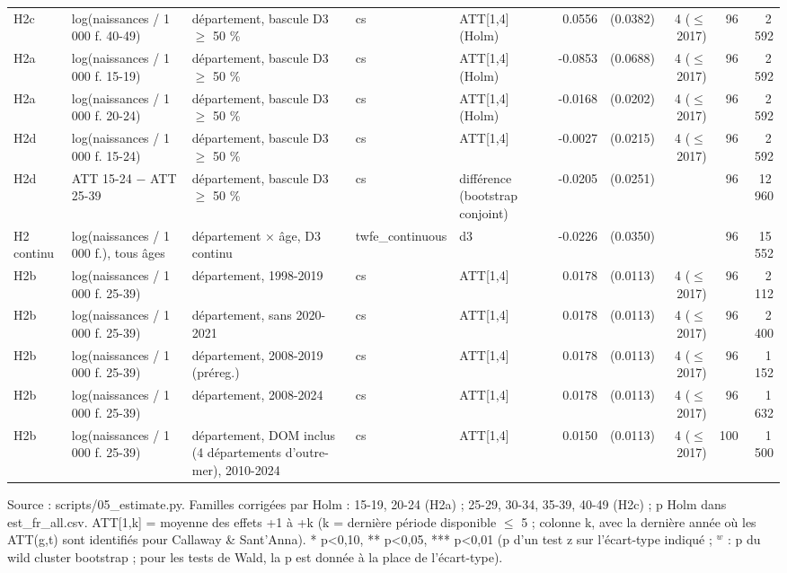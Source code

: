 \begin{table}
\begin{threeparttable}
\begin{tabular}{lp{4.0cm}p{5.1cm}lp{3.5cm}rrrrr}
H2c & log(naissances / 1 000 f. 40-49) & département, bascule D3 $\geq$ 50 \% & cs & ATT[1,4] (Holm) & 0.0556 & (0.0382) & 4 ($\leq$ 2017) & 96 & 2\,592 \\
H2a & log(naissances / 1 000 f. 15-19) & département, bascule D3 $\geq$ 50 \% & cs & ATT[1,4] (Holm) & -0.0853 & (0.0688) & 4 ($\leq$ 2017) & 96 & 2\,592 \\
H2a & log(naissances / 1 000 f. 20-24) & département, bascule D3 $\geq$ 50 \% & cs & ATT[1,4] (Holm) & -0.0168 & (0.0202) & 4 ($\leq$ 2017) & 96 & 2\,592 \\
H2d & log(naissances / 1 000 f. 15-24) & département, bascule D3 $\geq$ 50 \% & cs & ATT[1,4] & -0.0027 & (0.0215) & 4 ($\leq$ 2017) & 96 & 2\,592 \\
H2d & ATT 15-24 $-$ ATT 25-39 & département, bascule D3 $\geq$ 50 \% & cs & différence (bootstrap conjoint) & -0.0205 & (0.0251) &  & 96 & 12\,960 \\
H2 continu & log(naissances / 1 000 f.), tous âges & département × âge, D3 continu & twfe\_continuous & d3 & -0.0226 & (0.0350) &  & 96 & 15\,552 \\
H2b & log(naissances / 1 000 f. 25-39) & département, 1998-2019 & cs & ATT[1,4] & 0.0178 & (0.0113) & 4 ($\leq$ 2017) & 96 & 2\,112 \\
H2b & log(naissances / 1 000 f. 25-39) & département, sans 2020-2021 & cs & ATT[1,4] & 0.0178 & (0.0113) & 4 ($\leq$ 2017) & 96 & 2\,400 \\
H2b & log(naissances / 1 000 f. 25-39) & département, 2008-2019 (préreg.) & cs & ATT[1,4] & 0.0178 & (0.0113) & 4 ($\leq$ 2017) & 96 & 1\,152 \\
H2b & log(naissances / 1 000 f. 25-39) & département, 2008-2024 & cs & ATT[1,4] & 0.0178 & (0.0113) & 4 ($\leq$ 2017) & 96 & 1\,632 \\
H2b & log(naissances / 1 000 f. 25-39) & département, DOM inclus (4 départements d'outre-mer), 2010-2024 & cs & ATT[1,4] & 0.0150 & (0.0113) & 4 ($\leq$ 2017) & 100 & 1\,500 \\
\bottomrule
\end{tabular}
\begin{tablenotes}\footnotesize
\item Source : scripts/05\_estimate.py. Familles corrigées par Holm : 15-19, 20-24 (H2a) ; 25-29, 30-34, 35-39, 40-49 (H2c) ; p Holm dans est\_fr\_all.csv. ATT[1,k] = moyenne des effets +1 à +k (k = dernière période disponible $\leq$ 5 ; colonne k, avec la dernière année où les ATT(g,t) sont identifiés pour Callaway \& Sant'Anna). * p<0,10, ** p<0,05, *** p<0,01 (p d'un test z sur l'écart-type indiqué ; $^{w}$ : p du wild cluster bootstrap ; pour les tests de Wald, la p est donnée à la place de l'écart-type).
\end{tablenotes}
\end{threeparttable}
\end{table}
